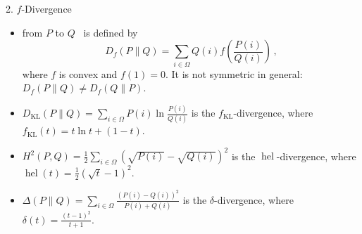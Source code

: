 \documentclass[final]{beamer}
\DeclareMathOperator{\hel}{hel}
\newcommand{\kl}[2]{D_{\mathrm{KL}}( #1 \parallel #2 )}
\newlength{\onecolwid}
\begin{document}
\begin{frame}[t]
\begin{columns}[t]
\begin{column}{\onecolwid}
		
	\begin{block}{2. $ f $-Divergence}
\begin{itemize}	
		\item	{}  from $ P $ 
		to $ Q $~\cite{csiszar1964informationstheoretische}  
			is defined by
			\begin{equation}\label{eq:definition_f_divergence}
			D_f(P\parallel Q) = \sum_{i\in \Omega} Q(i) f\left( 
			\frac{P(i)}{Q(i)} 
			\right) \,,
			\end{equation}
			where $ f $ is convex and $ f(1)=0 $.
			It is not symmetric in general: $ D_f(P\parallel 
			Q)\ne 
			D_f(Q\parallel P) $.
			
			\item {} $ \kl{P}{Q}= \sum_{i\in 
			\Omega} P(i) \ln\frac{P(i)}{Q(i)}  $ is the $ 
			f_{\mathrm{KL}} 
			$-divergence,
			where
			 $ f_{\mathrm{KL}}(t) = t\ln t + (1-t) $.
			
		\item	{}
	 $ H^2(P,Q) = 
		\frac{1}{2} \sum_{i\in \Omega} 
		(\sqrt{P(i)}-\sqrt{Q(i)})^2 $ is 
		the $ \hel 
		$-divergence, where
			 $ \hel(t)=\frac{1}{2}(\sqrt{t}-1)^2 $.
		\item  {}
		$\Delta(P\parallel Q) = \sum_{i\in 
			\Omega} 
		\frac{(P(i)-Q(i))^2}{P(i)+Q(i)}$ is the $ \delta $-divergence, where
			 $ \delta(t) = \frac{(t-1)^2}{t+1} $.
			

\end{itemize}
\end{block}
\end{column}
\end{columns}
\end{frame}
\end{document}
